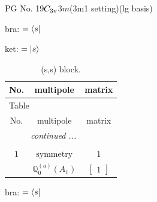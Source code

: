 \documentclass[fleqn,8pt,landscape]{jsarticle}
\begin{document}
\setcounter{MaxMatrixCols}{32}

\renewcommand{\tablename}{Table~}
\renewcommand{\figurename}{Figure~}
\begin{center}
\LARGE
PG No. 19\quad$C_{\rm 3v}$\quad$3m$\quad(3m1 setting)\quad[ trigonal ] (lg basis)
\end{center}
bra: $=\bra{s}$

\noindent
ket: $=\ket{s}$
\renewcommand{\arraystretch}{1.6}
\begin{longtable}{ccc}
\caption{(s,s) block.}
 \\
 \hline \hline
No. & multipole & matrix \\ \hline \endfirsthead

\multicolumn{2}{l}{\tablename\ \thetable{}} \\
 \hline \hline
No. & multipole & matrix \\ \hline \endhead

 \hline \hline
\multicolumn{2}{r}{\footnotesize\it continued ...} \\ \endfoot

 \hline \hline
\multicolumn{2}{r}{} \\ \endlastfoot

$ 1 $ & $ \text{symmetry} $ & $ 1 $ \\
$  $ & $ \mathbb{Q}_{0}^{(a)}(A_{1}) $ & $ \begin{bmatrix} 1 \end{bmatrix} $ \\ \hline
\end{longtable}
bra: $=\bra{s}$
\end{document}
